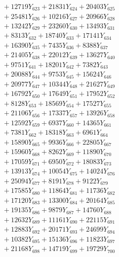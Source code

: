 \documentclass[a4paper,10pt]{article}
\begin{document}
{\begin{align}
&\;  + 12719 Y_{623} + 21831 Y_{624} + 20403 Y_{625} \\[0.3ex]
&\;  + 25481 Y_{626} + 10216 Y_{627} + 20966 Y_{628} \\[0.5ex]\allowbreak
&\;  + 13242 Y_{629} + 23260 Y_{630} + 13493 Y_{631} \\[0.3ex]
&\;  + 8313 Y_{632} + 18740 Y_{633} + 17141 Y_{634} \\[0.3ex]
&\;  + 16390 Y_{635} + 7435 Y_{636} + 8388 Y_{637} \\[0.3ex]
&\;  + 21405 Y_{638} + 22012 Y_{639} + 13627 Y_{640} \\[0.3ex]
&\;  + 9751 Y_{641} + 18201 Y_{642} + 7382 Y_{643} \\[0.3ex]
&\;  + 20088 Y_{644} + 9753 Y_{645} + 15624 Y_{646} \\[0.3ex]
&\;  + 20977 Y_{647} + 10344 Y_{648} + 21627 Y_{649} \\[0.3ex]
&\;  + 16792 Y_{650} + 17649 Y_{651} + 17952 Y_{652} \\[0.3ex]
&\;  + 8128 Y_{653} + 18569 Y_{654} + 17527 Y_{655} \\[0.3ex]
&\;  + 21106 Y_{656} + 17337 Y_{657} + 13926 Y_{658} \\[0.5ex]\allowbreak
&\;  + 12592 Y_{659} + 6937 Y_{660} + 14365 Y_{661} \\[0.3ex]
&\;  + 7381 Y_{662} + 18318 Y_{663} + 6961 Y_{664} \\[0.3ex]
&\;  + 15890 Y_{665} + 9936 Y_{666} + 22805 Y_{667} \\[0.3ex]
&\;  + 15960 Y_{668} + 8262 Y_{669} + 11890 Y_{670} \\[0.3ex]
&\;  + 17059 Y_{671} + 6950 Y_{672} + 18083 Y_{673} \\[0.3ex]
&\;  + 13913 Y_{674} + 10054 Y_{675} + 14024 Y_{676} \\[0.3ex]
&\;  + 25094 Y_{677} + 8191 Y_{678} + 9122 Y_{679} \\[0.3ex]
&\;  + 17585 Y_{680} + 11864 Y_{681} + 11736 Y_{682} \\[0.3ex]
&\;  + 17120 Y_{683} + 13300 Y_{684} + 20164 Y_{685} \\[0.3ex]
&\;  + 19135 Y_{686} + 9879 Y_{687} + 14760 Y_{688} \\[0.5ex]\allowbreak
&\;  + 12632 Y_{689} + 11161 Y_{690} + 22115 Y_{691} \\[0.3ex]
&\;  + 12883 Y_{692} + 20171 Y_{693} + 24699 Y_{694} \\[0.3ex]
&\;  + 10382 Y_{695} + 15136 Y_{696} + 11823 Y_{697} \\[0.3ex]
&\;  + 21168 Y_{698} + 14719 Y_{699} + 19729 Y_{700} \\[0.3ex]

\end{align}}
\end{document}
